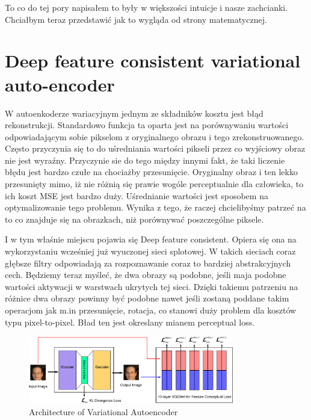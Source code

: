 To co do tej pory napisałem to były w większości intuicje i nasze zachcianki. Chciałbym teraz przedstawić jak to wygląda od strony matematycznej.


%

\section{Deep feature consistent variational auto-encoder}

W autoenkoderze wariacyjnym jednym ze składników kosztu jest błąd rekonstrukcji. Standardowo funkcja ta oparta jest na porównywaniu wartości odpowiadającym sobie pikselom z oryginalnego obrazu i tego zrekonstruowanego. Często przyczynia się to do uśredniania wartości pikseli przez co wyjściowy obraz nie jest wyraźny. Przyczynie sie do tego między innymi fakt, że taki liczenie błędu jest bardzo czułe na chociażby przesunięcie. Oryginalny obraz i ten lekko przesunięty mimo, iż nie różnią się prawie wogóle perceptualnie dla człowieka, to ich koszt MSE jest bardzo duży. Uśrednianie wartości jest sposobem na optymalizowanie tego problemu. Wynika z tego, że raczej chcielibyśmy patrzeć na to co znajduje się na obrazkach, niż porównywać poszczególne piksele.

I w tym właśnie miejscu pojawia się Deep feature consistent. Opiera się ona na wykorzystaniu wcześniej już wyuczonej sieci splotowej. W takich sieciach coraz głębsze filtry odpowiadają za rozpoznawanie coraz to bardziej abstrakcyjnych cech. Będziemy teraz myśleć, że dwa obrazy są podobne, jeśli maja podobne wartości aktywacji w warstwach ukrytych tej sieci. Dzięki takiemu patrzeniu na różnice dwa obrazy powinny być podobne nawet jeśli zostaną poddane takim operacjom jak m.in przesunięcie, rotacja, co stanowi duży problem dla kosztów typu pixel-to-pixel. Bład ten jest okreslany mianem perceptual loss.

\begin{figure}[h!]
    \centering
    \includegraphics[width=0.8\textwidth]{images/dfc_vae}
    \caption{Architecture of Variational Autoencoder}
    \label{fig:dfc_vae}
\end{figure}
